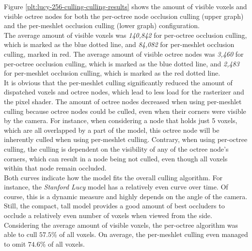 
\noindent
Figure \ref{plt:lucy-256-culling-culling-results} shows the amount of visible voxels and visible octree 
nodes for both the per-octree node occlusion culling (upper graph) and the per-meshlet occlusion culling 
(lower graph) configuration. \\

\noindent
The average amount of visible voxels was \emph{140,842} for per-octree occlusion culling, which is marked 
as the blue dotted line, and \emph{84,082} for per-meshlet occlusion culling, marked in red. The average 
amount of visible octree nodes was \emph{3,460} for per-octree occlusion culling, which is marked as the 
blue dotted line, and \emph{2,483} for per-meshlet occlusion culling, which is marked as the red dotted 
line. \\

It is obvious that the per-meshlet culling significantly reduced the amount of dispatched voxels and octree nodes, 
which lead to less load for the rasterizer and the pixel shader. The amount of octree nodes decreased when using 
per-meshlet culling because octree nodes could be culled, even when their corners were visible by the camera. 
For instance, when considering a node that holds just 5 voxels, which are all overlapped by a part of the model, 
this octree node will be inherently culled when using per-meshlet culling. Contrary, when using per-octree culling, 
the culling is dependent on the visibility of any of the octree node's corners, which can result in a node being not 
culled, even though all voxels within that node remain occluded. \\

\noindent 
Both curves indicate how the model fits the overall culling algorithm. For instance, the \emph{Stanford Lucy} 
model has a relatively even curve over time. Of course, this is a dynamic measure and highly depends on the 
angle of the camera. Still, the compact, tall model provides a good amount of best occluders to occlude a 
relatively even number of voxels when viewed from the side. \\

\noindent
Considering the average amount of visible voxels, the per-octree algorithm was able to cull $57.5\%$ of all 
voxels. On average, the per-meshlet culling even managed to omit $74.6\%$ of all voxels. 

